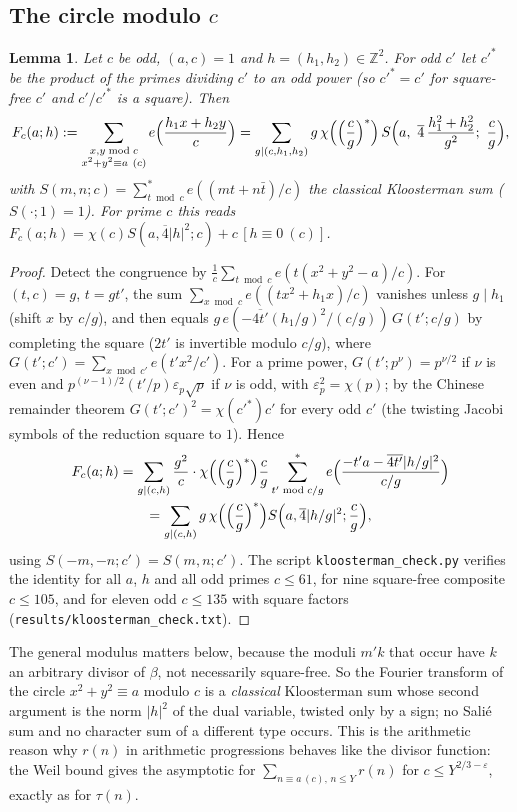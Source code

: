 \documentclass[11pt]{amsart}
\newtheorem{lemma}[theorem]{Lemma}
\theoremstyle{remark}
\newcommand{\Z}{\mathbb{Z}}
\newcommand{\e}{\varepsilon}
\begin{document}
\subsection{The circle modulo $c$}
\begin{lemma}\label{lem:circle}
Let $c$ be odd, $(a,c)=1$ and $h=(h_1,h_2)\in\Z^2$. For odd $c'$ let $c'^{*}$ be the product of the primes dividing $c'$ to an odd power (so $c'^{*}=c'$ for square-free $c'$ and $c'/c'^{*}$ is a square). Then
\[
F_c(a;h):=\sum_{\substack{x,y\bmod c\\ x^2+y^2\equiv a\ (c)}}e\Bigl(\frac{h_1x+h_2y}{c}\Bigr)=\sum_{g\mid(c,h_1,h_2)}g\,\chi\Bigl(\Bigl(\frac cg\Bigr)^{*}\Bigr)\,S\Bigl(a,\ \overline4\,\frac{h_1^2+h_2^2}{g^2};\ \frac cg\Bigr),
\]
with $S(m,n;c)=\sum_{t\bmod c}^{*}e((mt+n\bar t)/c)$ the classical Kloosterman sum ($S(\cdot;1)=1$). For prime $c$ this reads $F_c(a;h)=\chi(c)S(a,\overline4|h|^2;c)+c\,[h\equiv0\ (c)]$.
\end{lemma}
\begin{proof}
Detect the congruence by $\frac1c\sum_{t\bmod c}e(t(x^2+y^2-a)/c)$. For $(t,c)=g$, $t=gt'$, the sum $\sum_{x\bmod c}e((tx^2+h_1x)/c)$ vanishes unless $g\mid h_1$ (shift $x$ by $c/g$), and then equals $g\,e(-\overline{4t'}(h_1/g)^2/(c/g))\,G(t';c/g)$ by completing the square ($2t'$ is invertible modulo $c/g$), where $G(t';c')=\sum_{x\bmod c'}e(t'x^2/c')$. For a prime power, $G(t';p^\nu)=p^{\nu/2}$ if $\nu$ is even and $p^{(\nu-1)/2}(t'/p)\varepsilon_p\sqrt p$ if $\nu$ is odd, with $\varepsilon_p^2=\chi(p)$; by the Chinese remainder theorem $G(t';c')^2=\chi(c'^{*})c'$ for every odd $c'$ (the twisting Jacobi symbols of the reduction square to $1$). Hence
\begin{multline*}
F_c(a;h)=\sum_{g\mid(c,h)}\frac{g^2}{c}\cdot\chi\Bigl(\Bigl(\frac cg\Bigr)^{*}\Bigr)\frac cg\sum_{t'\bmod c/g}^{*}e\Bigl(\frac{-t'a-\overline{4t'}|h/g|^2}{c/g}\Bigr)\\
=\sum_{g\mid(c,h)}g\,\chi\Bigl(\Bigl(\frac cg\Bigr)^{*}\Bigr)S\Bigl(a,\overline4|h/g|^2;\frac cg\Bigr),
\end{multline*}
using $S(-m,-n;c')=S(m,n;c')$. The script \texttt{kloosterman\_check.py} verifies the identity for all $a$, $h$ and all odd primes $c\le61$, for nine square-free composite $c\le105$, and for eleven odd $c\le135$ with square factors (\texttt{results/kloosterman\_check.txt}).
\end{proof}

The general modulus matters below, because the moduli $m'k$ that occur have $k$ an arbitrary divisor of $\beta$, not necessarily square-free. So the Fourier transform of the circle $x^2+y^2\equiv a$ modulo $c$ is a \emph{classical} Kloosterman sum whose second argument is the norm $|h|^2$ of the dual variable, twisted only by a sign; no Sali\'e sum and no character sum of a different type occurs. This is the arithmetic reason why $r(n)$ in arithmetic progressions behaves like the divisor function: the Weil bound gives the asymptotic for $\sum_{n\equiv a\,(c),\,n\le Y}r(n)$ for $c\le Y^{2/3-\e}$, exactly as for $\tau(n)$.
\end{document}

